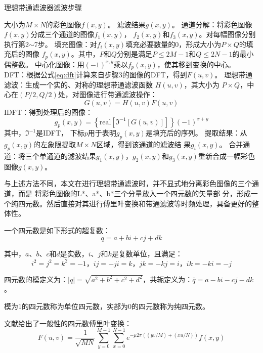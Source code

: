 \begin{algorithm}[htbp]
  \caption{理想带通滤波器滤波步骤}
  \label{alg:temporal-filter}
  \begin{algorithmic}[1]
    \REQUIRE 大小为$M\times N$的彩色图像$f(x,y)$。
    \ENSURE 滤波结果$g(x,y)$。
    \STATE 通道分解：将彩色图像$f(x,y)$分成三个通道的图像$f_1(x,y)$，
    $f_2(x,y)$和$f_3(x,y)$。对每幅图像分别执行第2$\sim$7步。
    \STATE 填充图像：对$f_i(x,y)$填充必要数量的0，形成大小为$P\times Q$的填充后的图像
    $f_{p}(x,y)$。其中，$P$和$Q$分别是满足$P\le 2M-1$和$Q\le 2N-1$的最小偶整数。
    \STATE 中心化图像：用$(-1)^{x,y}$乘以$f_{p}(x,y)$，使其移到变换的中心。
    \STATE DFT：根据公式\ref{eq:dft}计算来自步骤3的图像的DFT，得到$F(u,v)$。
    \STATE 理想带通滤波：生成一个实的、对称的理想带通滤波函数 $H(u,v)$，其大小为
    $P\times Q$，中心在$(P/2, Q/2)$处，对图像进行带通滤波操作：$$G(u,v)=H(u,v)F(u,v)$$
    \STATE IDFT：得到处理后的图像：$$g_p(x,y)=\left\{
      \mbox{real}[\Im^{-1}[G(u,v)]] \right\}(-1)^{x+y}$$ 其中，$\Im^{-1}$是IDFT，
    下标$p$用于表明$g_p(x,y)$是填充后的序列。
    \STATE 提取结果：从$g_p(x,y)$的左象限提取$M\times N$区域，得到该通道的滤波结
    果$g_i(x,y)$。
    \STATE 合并通道：将三个单通道的滤波结果$g_1(x,y)$，$g_2(x,y)$和$g_3(x,y)$重新合成一幅彩色图像$g(x,y)$。
  \end{algorithmic}
\end{algorithm}

与上述方法不同，本文在进行理想带通滤波时，并不显式地分离彩色图像的三个通道，而是
将彩色图像的L*、a*、b*三个分量放入一个四元数的矢量部
分，形成一个纯四元数。然后直接对其进行傅里叶变换和带通滤波等时频处理，具备更好的整体性。

一个四元数是如下形式的超复数：
\begin{equation}
  \label{eq:quaternion}
  q=a+bi+cj+dk
\end{equation}

其中，$a$、$b$、$c$和$d$是实数，$i$、$j$和$k$是复数单位，且满足：
\begin{equation}
  \label{eq:ijk}
  i^2=j^2=k^2=-1\mbox{，}ij=-ji=k\mbox{，}jk=-kj=i\mbox{，}ik=-ki=-j
\end{equation}

四元数的模定义为：$\left|q\right|=\sqrt{a^2+b^2+c^2+d^2}$，共轭定义为：$\bar{q}=a-bi-cj-dk$。

模为1的四元数称为单位四元数，实部为0的四元数称为纯四元数。

文献\cite{sangwine2000discrete}给出了一般性的四元数傅里叶变换：
\begin{equation}
  \label{eq:quaternion-dft}
  F(u,v)=\frac{1}{\sqrt{MN}}\sum_{y=0}^{M-1}\sum_{x=0}^{N-1}e^{-\mu 2\pi((yv/M)+(xu/N))}f(x,y)
\end{equation}

